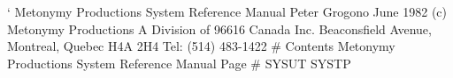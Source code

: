`
\ce Metonymy Productions
\ce System Reference Manual
\ce Peter Grogono
\ce June 1982
\ce (c) Metonymy Productions
\ce A Division of 96616 Canada Inc.
 Beaconsfield Avenue, Montreal, Quebec H4A 2H4  Tel: (514) 483-1422
\ep
{}
\tc # Contents
\fl Metonymy Productions             System Reference Manual            Page #
\ic SYSUT
\ic SYSTP
